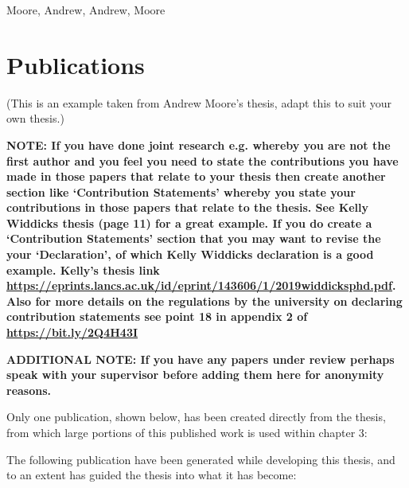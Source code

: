 \forcsvlist{\listadd\boldnames} %
  {{Moore, Andrew}, {Andrew, Moore}}

\section*{\centering Publications}
(This is an example taken from Andrew Moore's thesis, adapt this to suit your own thesis.)

\textbf{NOTE: If you have done joint research e.g. whereby you are not the first author and you feel you need to state the contributions you have made in those papers that relate to your thesis then create another section like `Contribution Statements' whereby you state your contributions in those papers that relate to the thesis. See Kelly Widdicks thesis (page 11) for a great example. If you do create a `Contribution Statements' section that you may want to revise the your `Declaration', of which Kelly Widdicks declaration is a good example. Kelly's thesis link \url{https://eprints.lancs.ac.uk/id/eprint/143606/1/2019widdicksphd.pdf}. Also for more details on the regulations by the university on declaring contribution statements see point 18 in appendix 2 of \url{https://bit.ly/2Q4H43I}}

\textbf{ADDITIONAL NOTE: If you have any papers under review perhaps speak with your supervisor before adding them here for anonymity reasons.}\vspace{1cm}

Only one publication, shown below, has been created directly from the thesis, from which large portions of this published work is used within chapter 3:\bigskip

\noindent {}\vspace{24pt}

\noindent The following publication have been generated while developing this thesis, and to an extent has guided the thesis into what it has become:\bigskip

\noindent {}\bigskip

\noindent {}\bigskip

\noindent {}\bigskip

\noindent {}

\renewcommand*{\boldnames}{} %